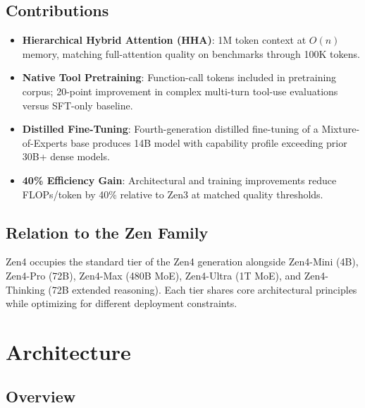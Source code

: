 \documentclass[11pt,a4paper]{article}
\begin{document}
\subsection{Contributions}

\begin{itemize}
    \item \textbf{Hierarchical Hybrid Attention (HHA)}: 1M token context at $O(n)$ memory,
    matching full-attention quality on benchmarks through 100K tokens.
    \item \textbf{Native Tool Pretraining}: Function-call tokens included in pretraining corpus;
    20-point improvement in complex multi-turn tool-use evaluations versus SFT-only baseline.
    \item \textbf{Distilled Fine-Tuning}: Fourth-generation distilled fine-tuning of a
    Mixture-of-Experts base produces 14B model with capability profile exceeding prior 30B+ dense models.
    \item \textbf{40\% Efficiency Gain}: Architectural and training improvements reduce FLOPs/token
    by 40\% relative to Zen3 at matched quality thresholds.
\end{itemize}

\subsection{Relation to the Zen Family}

Zen4 occupies the standard tier of the Zen4 generation alongside Zen4-Mini (4B), Zen4-Pro (72B),
Zen4-Max (480B MoE), Zen4-Ultra (1T MoE), and Zen4-Thinking (72B extended reasoning). Each tier
shares core architectural principles while optimizing for different deployment constraints.

\section{Architecture}

\subsection{Overview}
\end{document}
